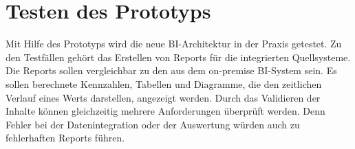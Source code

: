\section{Testen des Prototyps} \label{sec:intro:testenDesPrototyps}
Mit Hilfe des Prototyps wird die neue BI-Architektur in der Praxis getestet. Zu den Testfällen gehört das Erstellen von Reports für die integrierten Quellsysteme. Die Reports sollen vergleichbar zu den aus dem on-premise BI-System sein. Es sollen berechnete Kennzahlen, Tabellen und Diagramme, die den zeitlichen Verlauf eines Werts darstellen, angezeigt werden. Durch das Validieren der Inhalte können gleichzeitig mehrere Anforderungen überprüft werden. Denn Fehler bei der Datenintegration oder der Auswertung würden auch zu fehlerhaften Reports führen.